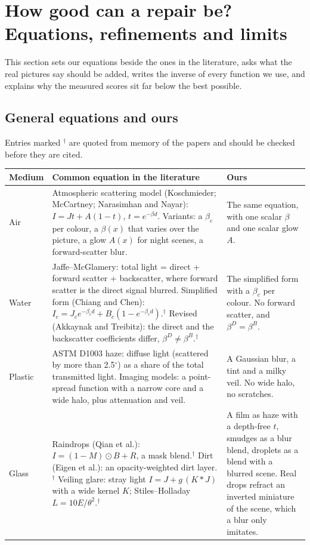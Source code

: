 \documentclass[10pt,a4paper]{article}
\begin{document}
\section{How good can a repair be? Equations, refinements and limits}
\label{sec:limits}
This section sets our equations beside the ones in the literature, asks what the real pictures say should be added, writes the inverse of every function we use, and explains why the measured scores sit far below the best possible.

\subsection{General equations and ours}
Entries marked $^\dagger$ are quoted from memory of the papers and should be checked before they are cited.
{\small\begin{longtable}{p{1.3cm}p{8.3cm}p{5.8cm}}
\toprule Medium & Common equation in the literature & Ours\\\midrule\endhead
Air & Atmospheric scattering model (Koschmieder; McCartney; Narasimhan and Nayar): $I=Jt+A(1-t)$, $t=e^{-\beta d}$. Variants: a $\beta_c$ per colour, a $\beta(x)$ that varies over the picture, a glow $A(x)$ for night scenes, a forward-scatter blur. & The same equation, with one scalar $\beta$ and one scalar glow $A$.\\
Water & Jaffe--McGlamery: total light = direct + forward scatter + backscatter, where forward scatter is the direct signal blurred. Simplified form (Chiang and Chen): $I_c=J_ce^{-\beta_cd}+B_c(1-e^{-\beta_cd})$.$^\dagger$ Revised (Akkaynak and Treibitz): the direct and the backscatter coefficients differ, $\beta^D\ne\beta^B$.$^\dagger$ & The simplified form with a $\beta_c$ per colour. No forward scatter, and $\beta^D=\beta^B$.\\
Plastic & ASTM D1003 haze: diffuse light (scattered by more than 2.5$^\circ$) as a share of the total transmitted light. Imaging models: a point-spread function with a narrow core and a wide halo, plus attenuation and veil. & A Gaussian blur, a tint and a milky veil. No wide halo, no scratches.\\
Glass & Raindrops (Qian et al.): $I=(1-M)\odot B+R$, a mask blend.$^\dagger$ Dirt (Eigen et al.): an opacity-weighted dirt layer.$^\dagger$ Veiling glare: stray light $I=J+g\,(K\!*\!J)$ with a wide kernel $K$; Stiles--Holladay $L=10E/\theta^2$.$^\dagger$ & A film as haze with a depth-free $t$, smudges as a blur blend, droplets as a blend with a blurred scene. Real drops refract an inverted miniature of the scene, which a blur only imitates.\\\bottomrule
\end{longtable}}
\end{document}
